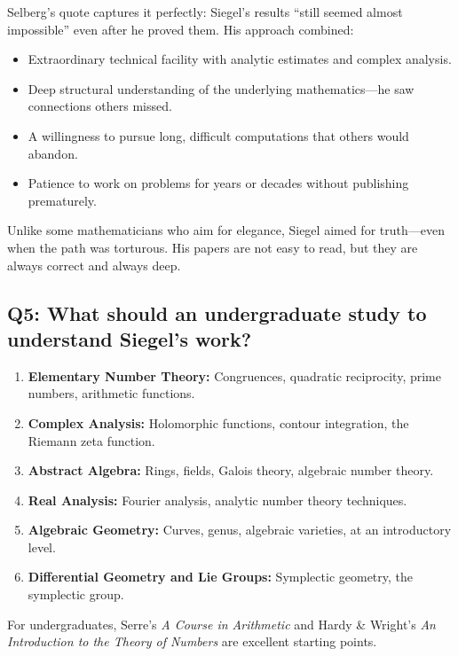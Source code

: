 Selberg's quote captures it perfectly: Siegel's results ``still seemed almost impossible'' even after he proved them. His approach combined:
\begin{itemize}
    \item Extraordinary technical facility with analytic estimates and complex analysis.
    \item Deep structural understanding of the underlying mathematics---he saw connections others missed.
    \item A willingness to pursue long, difficult computations that others would abandon.
    \item Patience to work on problems for years or decades without publishing prematurely.
\end{itemize}
Unlike some mathematicians who aim for elegance, Siegel aimed for truth---even when the path was torturous. His papers are not easy to read, but they are always correct and always deep.

\subsection*{Q5: What should an undergraduate study to understand Siegel's work?}

\begin{enumerate}
    \item \textbf{Elementary Number Theory:} Congruences, quadratic reciprocity, prime numbers, arithmetic functions.
    \item \textbf{Complex Analysis:} Holomorphic functions, contour integration, the Riemann zeta function.
    \item \textbf{Abstract Algebra:} Rings, fields, Galois theory, algebraic number theory.
    \item \textbf{Real Analysis:} Fourier analysis, analytic number theory techniques.
    \item \textbf{Algebraic Geometry:} Curves, genus, algebraic varieties, at an introductory level.
    \item \textbf{Differential Geometry and Lie Groups:} Symplectic geometry, the symplectic group.
\end{enumerate}

For undergraduates, Serre's \textit{A Course in Arithmetic} and Hardy \& Wright's \textit{An Introduction to the Theory of Numbers} are excellent starting points.

